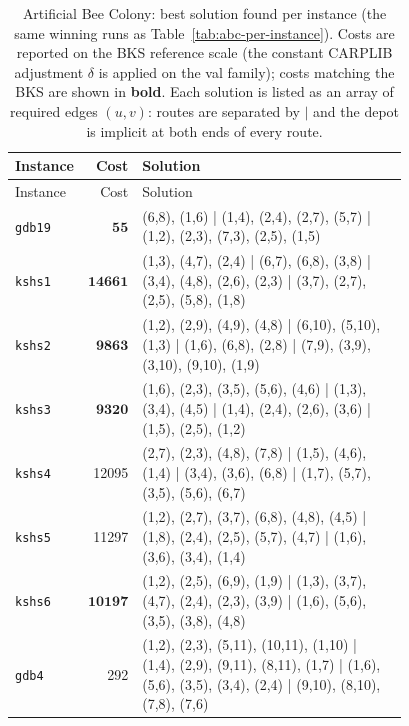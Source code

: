 \begin{landscape}
\begingroup\scriptsize
\begin{longtable}{lr>{\tiny\raggedright\arraybackslash}p{0.78\linewidth}}
\caption{Artificial Bee Colony: best solution found per instance (the same winning runs as Table~\ref{tab:abc-per-instance}). Costs are reported on the BKS reference scale (the constant CARPLIB adjustment $\delta$ is applied on the val family); costs matching the BKS are shown in \textbf{bold}. Each solution is listed as an array of required edges $(u,v)$: routes are separated by $|$ and the depot is implicit at both ends of every route.}\label{tab:abc-solutions}\\
\toprule
Instance & Cost & Solution \\
\midrule
\endfirsthead
\toprule
Instance & Cost & Solution \\
\midrule
\endhead
\bottomrule
\endfoot
\texttt{gdb19} & $\mathbf{55}$ & (6,8), (1,6) | (1,4), (2,4), (2,7), (5,7) | (1,2), (2,3), (7,3), (2,5), (1,5) \\[2pt]
\texttt{kshs1} & $\mathbf{14661}$ & (1,3), (4,7), (2,4) | (6,7), (6,8), (3,8) | (3,4), (4,8), (2,6), (2,3) | (3,7), (2,7), (2,5), (5,8), (1,8) \\[2pt]
\texttt{kshs2} & $\mathbf{9863}$ & (1,2), (2,9), (4,9), (4,8) | (6,10), (5,10), (1,3) | (1,6), (6,8), (2,8) | (7,9), (3,9), (3,10), (9,10), (1,9) \\[2pt]
\texttt{kshs3} & $\mathbf{9320}$ & (1,6), (2,3), (3,5), (5,6), (4,6) | (1,3), (3,4), (4,5) | (1,4), (2,4), (2,6), (3,6) | (1,5), (2,5), (1,2) \\[2pt]
\texttt{kshs4} & 12095 & (2,7), (2,3), (4,8), (7,8) | (1,5), (4,6), (1,4) | (3,4), (3,6), (6,8) | (1,7), (5,7), (3,5), (5,6), (6,7) \\[2pt]
\texttt{kshs5} & 11297 & (1,2), (2,7), (3,7), (6,8), (4,8), (4,5) | (1,8), (2,4), (2,5), (5,7), (4,7) | (1,6), (3,6), (3,4), (1,4) \\[2pt]
\texttt{kshs6} & $\mathbf{10197}$ & (1,2), (2,5), (6,9), (1,9) | (1,3), (3,7), (4,7), (2,4), (2,3), (3,9) | (1,6), (5,6), (3,5), (3,8), (4,8) \\[2pt]
\texttt{gdb4} & 292 & (1,2), (2,3), (5,11), (10,11), (1,10) | (1,4), (2,9), (9,11), (8,11), (1,7) | (1,6), (5,6), (3,5), (3,4), (2,4) | (9,10), (8,10), (7,8), (7,6) \\[2pt]

\end{longtable}
\end{landscape}
